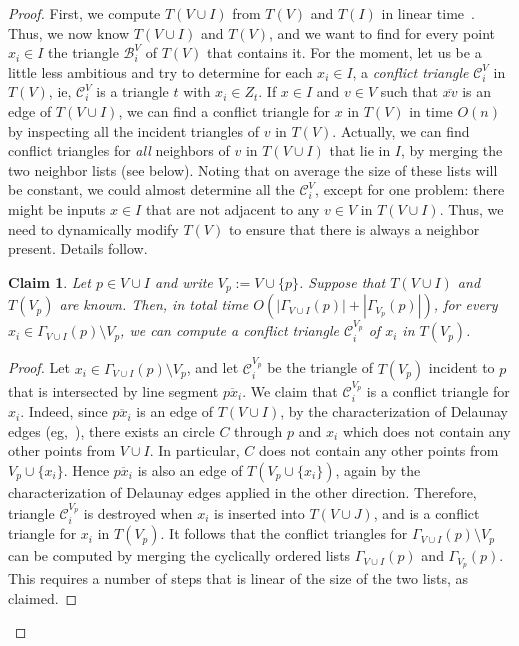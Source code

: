 \documentclass{siamltex}
\newcommand{\tsearch}{\mathcal{B}}
\newcommand{\tconf}{\mathcal{C}}
\newcommand{\eqdef}{:=}
\newtheorem{claim}[theorem]{Claim}
\begin{document}
\begin{proof}
First, we compute $T(V \cup I)$ from $T(V)$ and $T(I)$ in linear 
time~\cite{C,Kirkpatrick79}. Thus, we now know $T(V \cup I)$ and
$T(V)$, and we want to find for every point $x_i \in I$ the
triangle $\tsearch_i^V$ of $T(V)$ that contains it.
For the moment, let us be a little less ambitious and
try to determine for each $x_i \in I$, a \emph{conflict triangle}
$\tconf_i^V$ in $T(V)$, ie, $\tconf_i^V$ is a triangle $t$ with 
$x_i \in Z_t$.
If $x \in I$ and $v \in V$ such that
$\overline{xv}$ is an edge of $T(V \cup I)$, we can find
a conflict triangle for $x$ in $T(V)$ in 
time $O(n)$ by inspecting all the incident triangles of
$v$ in $T(V)$. Actually, we can find
conflict triangles for \emph{all} neighbors
of $v$ in $T(V \cup I)$ that lie in $I$, by
merging the two neighbor lists (see below).
Noting that on average the size of these lists 
will be constant, we could almost determine
all the $\tconf_i^V$, except for one problem:
there might be inputs $x \in I$ that are not 
adjacent to any $v \in V$ in $T(V \cup I)$.
Thus, we need to dynamically modify $T(V)$
to ensure that there is always a neighbor present.
Details follow.
\begin{claim}\label{clm:neighborfacets}
Let $p \in V \cup I$ and write $V_p \eqdef V \cup \{p\}$. Suppose 
that $T(V \cup I)$ and $T(V_p)$ are known.  
Then,
in total time $O(|\Gamma_{V \cup I}(p)| + |\Gamma_{V_p}(p)|)$,
for every $x_i \in \Gamma_{V \cup I}(p) \setminus V_p$,
we can compute a conflict triangle $\tconf^{V_p}_i$ of $x_i$ in 
$T(V_p)$.
\end{claim}

\begin{proof}
Let $x_i \in \Gamma_{V \cup I}(p) \setminus V_p$,
and let $\tconf^{V_p}_i$ be the triangle of $T(V_p)$ incident to $p$ that
is intersected by line segment $\overline{px_i}$. We claim that 
$\tconf^{V_p}_i$ is
a conflict triangle for $x_i$. Indeed, since $\overline{px_i}$ is an edge
of $T(V \cup I)$, by the characterization of Delaunay edges 
(eg,~\cite[Theorem~9.6(ii)]{deBergKrOvSc00}), there exists an circle 
$C$ through $p$ 
and $x_i$ which does not contain any other points from 
$V \cup I$. In particular, $C$ does not contain any other
points from $V_p \cup \{x_i\}$. Hence $\overline{px_i}$ is also an edge
of $T(V_p \cup \{x_i\})$, again by the characterization of Delaunay
edges applied in the other direction. Therefore, triangle 
$\tconf^{V_p}_i$ is
destroyed when $x_i$ is inserted into $T(V \cup J)$, and is
a conflict triangle for $x_i$ in $T(V_p)$.
It follows that the conflict triangles for 
$\Gamma_{V \cup I}(p) \setminus V_p$ 
can be
computed by merging the cyclically ordered lists $\Gamma_{V \cup I}(p)$ and 
$\Gamma_{V_p}(p)$. This requires a number of steps that is linear of 
the size of the two lists, as claimed.
\end{proof}


\end{proof}
\end{document}
